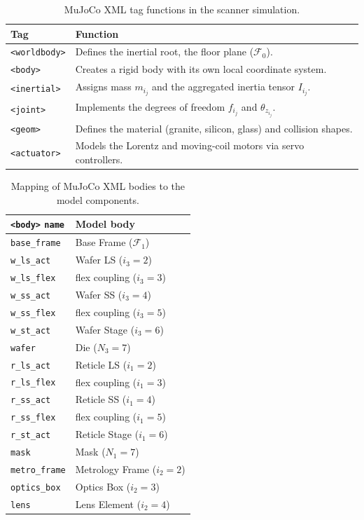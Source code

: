 \documentclass[11pt,letterpaper]{article}
\begin{document}
\begin{table}[H]
\centering
\caption{MuJoCo XML tag functions in the scanner simulation.}
\label{tab:tags}
\begin{tabular}{ll}
\toprule
Tag & Function \\
\midrule
\texttt{<worldbody>} & Defines the inertial root, the floor plane ($\mathcal{F}_0$). \\
\texttt{<body>}      & Creates a rigid body with its own local coordinate system. \\
\texttt{<inertial>}  & Assigns mass $m_{i_j}$ and the aggregated inertia tensor $I_{i_j}$. \\
\texttt{<joint>}     & Implements the degrees of freedom $f_{i_j}$ and $\theta_{z_{i_j}}$. \\
\texttt{<geom>}      & Defines the material (granite, silicon, glass) and collision shapes. \\
\texttt{<actuator>}  & Models the Lorentz and moving-coil motors via servo controllers. \\
\bottomrule
\end{tabular}
\end{table}

\begin{table}[H]
\centering
\caption{Mapping of MuJoCo XML bodies to the model components.}
\label{tab:bodies}
\begin{tabular}{ll}
\toprule
\texttt{<body>} \texttt{name} & Model body \\
\midrule
\texttt{base\_frame}  & Base Frame ($\mathcal{F}_1$) \\
\texttt{w\_ls\_act}   & Wafer LS ($i_3=2$) \\
\texttt{w\_ls\_flex}  & flex coupling ($i_3=3$) \\
\texttt{w\_ss\_act}   & Wafer SS ($i_3=4$) \\
\texttt{w\_ss\_flex}  & flex coupling ($i_3=5$) \\
\texttt{w\_st\_act}   & Wafer Stage ($i_3=6$) \\
\texttt{wafer}        & Die ($N_3=7$) \\
\texttt{r\_ls\_act}   & Reticle LS ($i_1=2$) \\
\texttt{r\_ls\_flex}  & flex coupling ($i_1=3$) \\
\texttt{r\_ss\_act}   & Reticle SS ($i_1=4$) \\
\texttt{r\_ss\_flex}  & flex coupling ($i_1=5$) \\
\texttt{r\_st\_act}   & Reticle Stage ($i_1=6$) \\
\texttt{mask}         & Mask ($N_1=7$) \\
\texttt{metro\_frame} & Metrology Frame ($i_2=2$) \\
\texttt{optics\_box}  & Optics Box ($i_2=3$) \\
\texttt{lens}         & Lens Element ($i_2=4$) \\
\bottomrule
\end{tabular}
\end{table}
\end{document}
